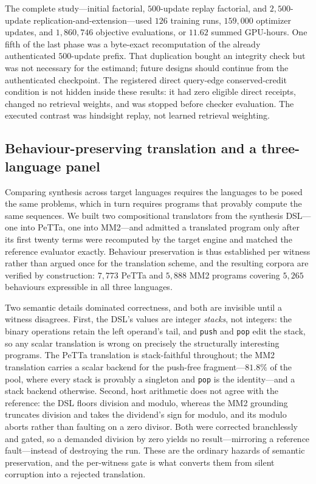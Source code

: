 \documentclass[11pt]{article}
\newcommand{\code}[1]{\texttt{#1}}
\begin{document}
The complete study---initial factorial, $500$-update replay factorial, and
$2{,}500$-update replication-and-extension---used $126$ training runs, $159{,}000$
optimizer updates, and $1{,}860{,}746$ objective evaluations, or $11.62$ summed
GPU-hours.  One fifth of the last phase was a byte-exact recomputation of the already
authenticated $500$-update prefix.  That duplication bought an integrity check but was
not necessary for the estimand; future designs should continue from the authenticated
checkpoint.  The registered direct query-edge conserved-credit condition is not hidden
inside these results: it had zero eligible direct receipts, changed no retrieval weights,
and was stopped before checker evaluation.  The executed contrast was hindsight replay,
not learned retrieval weighting.

\subsection{Behaviour-preserving translation and a three-language panel}
\label{sec:cross-language-translation}

Comparing synthesis across target languages requires the languages to be posed the same
problems, which in turn requires programs that provably compute the same sequences.  We
built two compositional translators from the synthesis DSL---one into PeTTa, one into
MM2---and admitted a translated program only after its first twenty terms were recomputed
by the target engine and matched the reference evaluator exactly.  Behaviour preservation
is thus established per witness rather than argued once for the translation scheme, and
the resulting corpora are verified by construction: $7{,}773$ PeTTa and $5{,}888$ MM2
programs covering $5{,}265$ behaviours expressible in all three languages.

Two semantic details dominated correctness, and both are invisible until a witness
disagrees.  First, the DSL's values are integer \emph{stacks}, not integers: the binary
operations retain the left operand's tail, and \code{push} and \code{pop} edit the stack,
so any scalar translation is wrong on precisely the structurally interesting programs.
The PeTTa translation is stack-faithful throughout; the MM2 translation carries a scalar
backend for the push-free fragment---$81.8\%$ of the pool, where every stack is provably a
singleton and \code{pop} is the identity---and a stack backend otherwise.  Second, host
arithmetic does not agree with the reference: the DSL floors division and modulo, whereas
the MM2 grounding truncates division and takes the dividend's sign for modulo, and its
modulo aborts rather than faulting on a zero divisor.  Both were corrected branchlessly
and gated, so a demanded division by zero yields no result---mirroring a reference
fault---instead of destroying the run.  These are the ordinary hazards of semantic
preservation, and the per-witness gate is what converts them from silent corruption into
a rejected translation.
\end{document}
